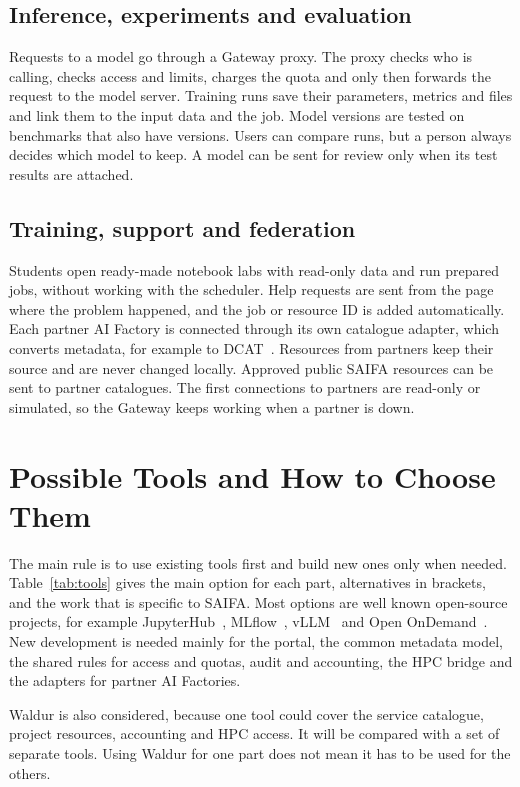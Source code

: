 \documentclass[conference,a4paper]{IEEEtran}
\begin{document}
\subsection{Inference, experiments and evaluation}
Requests to a model go through a Gateway proxy. The proxy checks who is calling, checks access and limits, charges the quota and only then forwards the request to the model server. Training runs save their parameters, metrics and files and link them to the input data and the job. Model versions are tested on benchmarks that also have versions. Users can compare runs, but a person always decides which model to keep. A model can be sent for review only when its test results are attached.

\subsection{Training, support and federation}
Students open ready-made notebook labs with read-only data and run prepared jobs, without working with the scheduler. Help requests are sent from the page where the problem happened, and the job or resource ID is added automatically. Each partner AI Factory is connected through its own catalogue adapter, which converts metadata, for example to DCAT~\cite{w3c_dcat3}. Resources from partners keep their source and are never changed locally. Approved public SAIFA resources can be sent to partner catalogues. The first connections to partners are read-only or simulated, so the Gateway keeps working when a partner is down.

\section{Possible Tools and How to Choose Them}

The main rule is to use existing tools first and build new ones only when needed. Table~\ref{tab:tools} gives the main option for each part, alternatives in brackets, and the work that is specific to SAIFA. Most options are well known open-source projects, for example JupyterHub~\cite{kluyver2016jupyter}, MLflow~\cite{zaharia2018mlflow}, vLLM~\cite{kwon2023vllm} and Open OnDemand~\cite{hudak2018ood}. New development is needed mainly for the portal, the common metadata model, the shared rules for access and quotas, audit and accounting, the HPC bridge and the adapters for partner AI Factories.

Waldur is also considered, because one tool could cover the service catalogue, project resources, accounting and HPC access. It will be compared with a set of separate tools. Using Waldur for one part does not mean it has to be used for the others.
\end{document}
